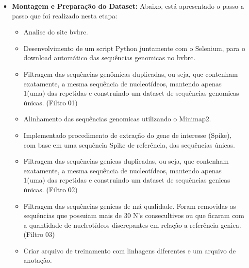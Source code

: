 \begin{itemize}
  \item \textbf{Montagem e Preparação do Dataset:}  Abaixo, está apresentado o passo a passo que foi realizado nesta etapa:
        \begin{itemize}
          \item Analise do site \gls{bvbrc}.
          \item Desenvolvimento de um script Python juntamente com o Selenium, para o download automático das sequências genomicas no \gls{bvbrc}.
          \item Filtragem das sequências genômicas duplicadas, ou seja, que contenham exatamente, a mesma sequência de nucleotídeos, mantendo apenas 1(uma) das repetidas e construindo um dataset de sequências genomicas únicas. (Filtro 01)
          \item Alinhamento das sequências genomicas utilizando o Minimap2.
          \item Implementado procedimento de extração do gene de interesse (Spike), com base em uma sequência Spike de referência, das sequências únicas.
          \item Filtragem das sequências genicas duplicadas, ou seja, que contenham exatamente, a mesma sequência de nucleotídeos, mantendo apenas 1(uma) das repetidas e construindo um dataset de sequências genicas únicas. (Filtro 02)
          \item Filtragem das sequências genicas de má qualidade. Foram removidas as sequências que possuiam mais de 30 N's consecultivos ou que ficaram com a quantidade de nucleotídeos discrepantes em relação a referência genica. (Filtro 03)
          \item Criar arquivo de treinamento com linhagens diferentes e um arquivo de anotação. %
        \end{itemize}



\end{itemize}
